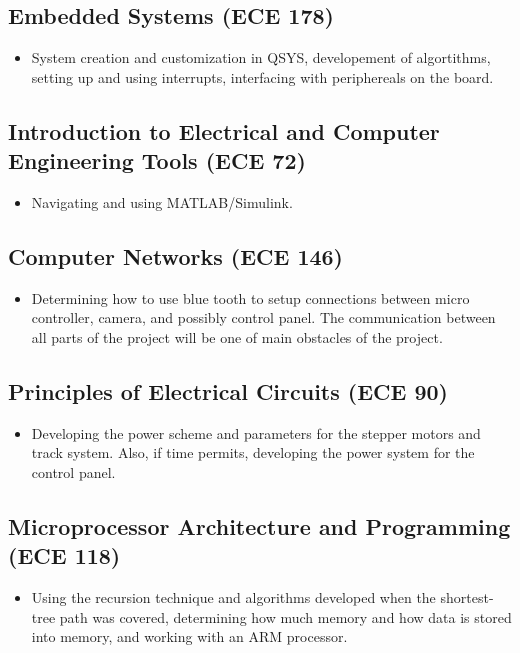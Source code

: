 \documentclass{IEEEtran}					%
\begin{document}
	\subsection{Embedded Systems (ECE 178)}
	\begin{itemize}
		 \item System creation and customization in QSYS, developement of algortithms, setting up and using interrupts, interfacing with periphereals on the board.
	\end{itemize}
	\subsection{Introduction to Electrical and Computer Engineering Tools (ECE 72)} 
	\begin{itemize}
		\item Navigating and using MATLAB/Simulink.
	\end{itemize}
	\subsection{Computer Networks (ECE 146)} 
	\begin{itemize}
		\item Determining how to use blue tooth to setup connections between micro controller, camera, and possibly control panel. The communication between all parts of the project will be one of main obstacles of the project.
	\end{itemize}
	\subsection{Principles of Electrical Circuits (ECE 90)}
	\begin{itemize}
		\item Developing the power scheme and parameters for the stepper motors and track system. Also, if time permits, developing the power system for the control panel.
	\end{itemize}
	\subsection{Microprocessor Architecture and Programming (ECE 118)}
	\begin{itemize}
		\item Using the recursion technique and algorithms developed when the shortest-tree path was covered, determining how much memory and how data is stored into memory, and working with an ARM processor.
	\end{itemize}
\end{document}
